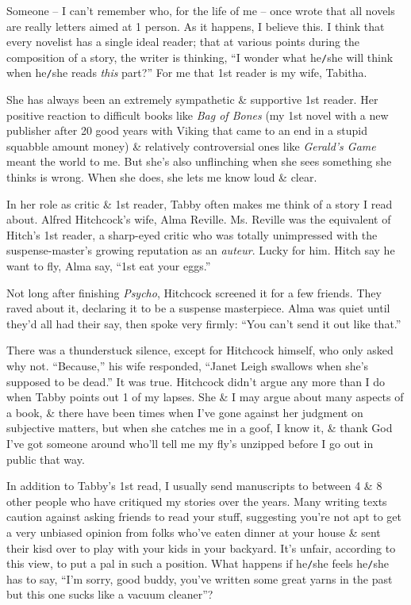 \documentclass{article}
\numberwithin{equation}{section}
\begin{document}
Someone -- I can't remember who, for the life of me -- once wrote that all novels are really letters aimed at 1 person. As it happens, I believe this. I think that every novelist has a single ideal reader; that at various points during the composition of a story, the writer is thinking, ``I wonder what he{\tt/}she will think when he{\tt/}she reads \textit{this} part?'' For me that 1st reader is my wife, Tabitha.

She has always been an extremely sympathetic \& supportive 1st reader. Her positive reaction to difficult books like \textit{Bag of Bones} (my 1st novel with a new publisher after 20 good years with Viking that came to an end in a stupid squabble amount money) \& relatively controversial ones like \textit{Gerald's Game} meant the world to me. But she's also unflinching when she sees something she thinks is wrong. When she does, she lets me know loud \& clear.

In her role as critic \& 1st reader, Tabby often makes me think of a story I read about. Alfred Hitchcock's wife, Alma Reville. Ms. Reville was the equivalent of Hitch's 1st reader, a sharp-eyed critic who was totally unimpressed with the suspense-master's growing reputation as an \textit{auteur}. Lucky for him. Hitch say he want to fly, Alma say, ``1st eat your eggs.''

Not long after finishing \textit{Psycho}, Hitchcock screened it for a few friends. They raved about it, declaring it to be a suspense masterpiece. Alma was quiet until they'd all had their say, then spoke very firmly: ``You can't send it out like that.''

There was a thunderstuck silence, except for Hitchcock himself, who only asked why not. ``Because,'' his wife responded, ``Janet Leigh swallows when she's supposed to be dead.'' It was true. Hitchcock didn't argue any more than I do when Tabby points out 1 of my lapses. She \& I may argue about many aspects of a book, \& there have been times when I've gone against her judgment on subjective matters, but when she catches me in a goof, I know it, \& thank God I've got someone around who'll tell me my fly's unzipped before I go out in public that way.

In addition to Tabby's 1st read, I usually send manuscripts to between 4 \& 8 other people who have critiqued my stories over the years. Many writing texts caution against asking friends to read your stuff, suggesting you're not apt to get a very unbiased opinion from folks who've eaten dinner at your house \& sent their kisd over to play with your kids in your backyard. It's unfair, according to this view, to put a pal in such a position. What happens if he{\tt/}she feels he{\tt/}she has to say, ``I'm sorry, good buddy, you've written some great yarns in the past but this one sucks like a vacuum cleaner''?
\end{document}
